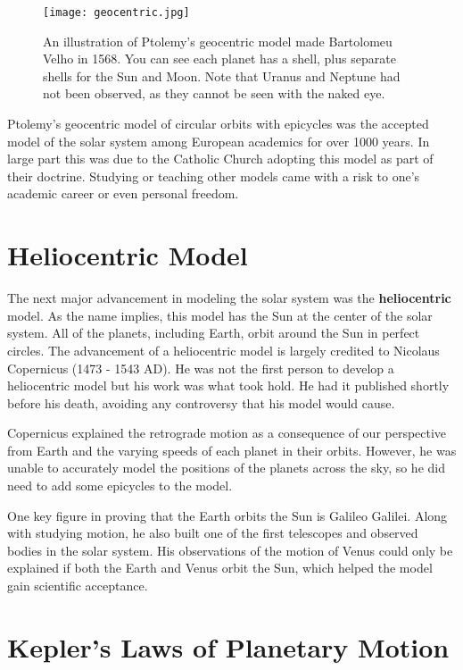 \documentclass[12pt]{book}
\begin{document}
\begin{figure}[t]
\centering
\texttt{[image: geocentric.jpg]}
\caption{An illustration of Ptolemy's geocentric model made Bartolomeu Velho in 1568. You can see each planet has a shell, plus separate shells for the Sun and Moon. Note that Uranus and Neptune had not been observed, as they cannot be seen with the naked eye.}
\label{geocentric}
\end{figure}

Ptolemy's geocentric model of circular orbits with epicycles was the accepted model of the solar system among European academics for over 1000 years. In large part this was due to the Catholic Church adopting this model as part of their doctrine. Studying or teaching other models came with a risk to one's academic career or even personal freedom.

\section{Heliocentric Model}

The next major advancement in modeling the solar system was the \textbf{heliocentric} model. As the name implies, this model has the Sun at the center of the solar system. All of the planets, including Earth, orbit around the Sun in perfect circles. The advancement of a heliocentric model is largely credited to Nicolaus Copernicus (1473 - 1543 AD). He was not the first person to develop a heliocentric model but his work was what took hold. He had it published shortly before his death, avoiding any controversy that his model would cause.

Copernicus explained the retrograde motion as a consequence of our perspective from Earth and the varying speeds of each planet in their orbits. However, he was unable to accurately model the positions of the planets across the sky, so he did need to add some epicycles to the model.

One key figure in proving that the Earth orbits the Sun is Galileo Galilei. Along with studying motion, he also built one of the first telescopes and observed bodies in the solar system. His observations of the motion of Venus could only be explained if both the Earth and Venus orbit the Sun, which helped the model gain scientific acceptance.

\section{Kepler's Laws of Planetary Motion}
\end{document}
